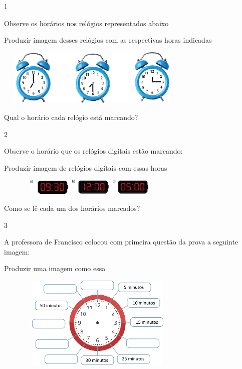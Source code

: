 \begin{escolha}
\num{1}

Observe os horários nos relógios representados abaixo

Produzir imagem desses relógios com as respectivas horas indicadas

\includegraphics[width=3.66698in,height=1.05843in]{media/image51.png}

Qual o horário cada relógio está marcando?


\num{2}

Observe o horário que os relógios digitais estão marcando:

Produzir imagem de relógios digitais com essas horas

\includegraphics[width=3.54197in,height=0.29169in]{media/image52.png}

Como se lê cada um dos horários marcados?


\num{3}

A professora de Francisco colocou com primeira questão da prova a
seguinte imagem:

Produzir uma imagem como essa

\includegraphics[width=3.90034in,height=1.75015in]{media/image53.png}


\end{escolha}
